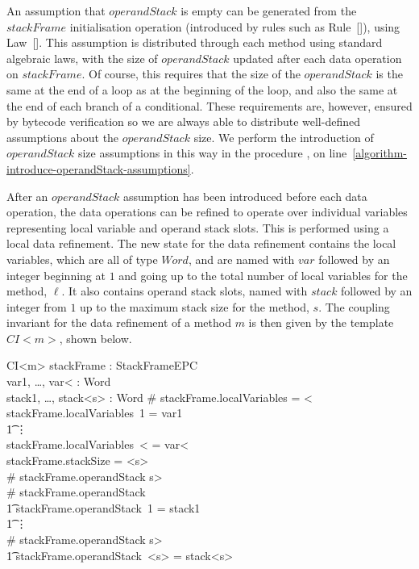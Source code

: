 An assumption that $operandStack$ is empty can be generated from the
$stackFrame$ initialisation operation (introduced by rules such as
Rule~[]), using
Law~[].
This assumption is distributed through each method using standard
algebraic laws, with the size of $operandStack$ updated after each
data operation on $stackFrame$.
Of course, this requires that the size of the $operandStack$ is the
same at the end of a loop as at the beginning of the loop, and also
the same at the end of each branch of a conditional.
These requirements are, however, ensured by bytecode verification so
we are always able to distribute well-defined assumptions about the
$operandStack$ size.
We perform the introduction of $operandStack$ size assumptions in this
way in the procedure , on
line~\ref{algorithm-introduce-operandStack-assumptions}.

After an $operandStack$ assumption has been introduced before each
data operation, the data operations can be refined to operate over
individual variables representing local variable and operand stack
slots.
This is performed using a local data refinement.
The new state for the data refinement contains the local variables,
which are all of type $Word$, and are named with $var$ followed by an
integer beginning at $1$ and going up to the total number of local
variables for the method, $\ell$.
It also contains operand stack slots, named with $stack$ followed by
an integer from $1$ up to the maximum stack size for the method, $s$.
The coupling invariant for the data refinement of a method $m$ is then
given by the template $CI{<}m{>}$, shown below.

\begin{schema}{CI{<}m{>}}
  stackFrame : StackFrameEPC \\
  var1, \ldots, var{<}\ell{>} : Word \\
  stack1, \ldots, stack{<}s{>} : Word
\where
  \# stackFrame.localVariables = {<}\ell{>} \\
  stackFrame.localVariables~1 = var1 \\
  \t1 \vdots \\
  stackFrame.localVariables~{<}\ell{>} = var{<}\ell{>} \\
  stackFrame.stackSize = {<}s{>} \\
  \# stackFrame.operandStack \leq {<}s{>} \\
  \# stackFrame.operandStack  \implies \\
  \t1 stackFrame.operandStack~1 = stack1 \\
  \t1 \vdots \\
  \# stackFrame.operandStack \geq {<}s{>} \implies \\
  \t1 stackFrame.operandStack~{<}s{>} = stack{<}s{>}
\end{schema}

